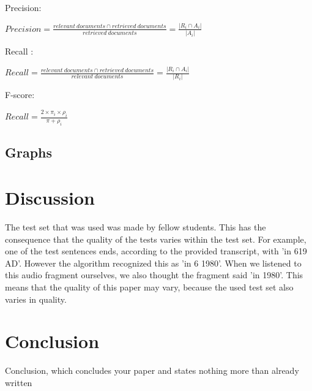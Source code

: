 \documentclass{article}
\begin{document}
    Precision: 
    \begin{center}
    $ Precision = \frac{relevant\ documents \cap retrieved\ documents}{retrieved\ documents} = \frac{|R_i \cap A_i|}{|A_i|} $ \\
    \end{center} 
    
    Recall : 
    \begin{center}
    $ Recall = \frac{relevant\ documents \cap retrieved\ documents}{relevant\ documents} = \frac{|R_i \cap A_i|}{|R_i|} $ \\
    \end{center} 
    
    F-score:
    \begin{center}
    $ Recall = \frac{2 \times \pi_i \times \rho_i}{\pi + \rho_i} $\\
    \end{center} 

\subsection{Graphs}

\section{Discussion}
The test set that was used was made by fellow students. This has the consequence that the quality of the tests varies within the test set. For example, one of the test sentences ends, according to the provided transcript, with 'in 619 AD'. However the algorithm recognized this as 'in 6 1980'. When we listened to this audio fragment ourselves, we also thought the fragment said 'in 1980'. This means that the quality of this paper may vary, because the used test set also varies in quality.

\section{Conclusion}
Conclusion, which concludes your paper and states nothing more than already
written

 
 
\end{document}
